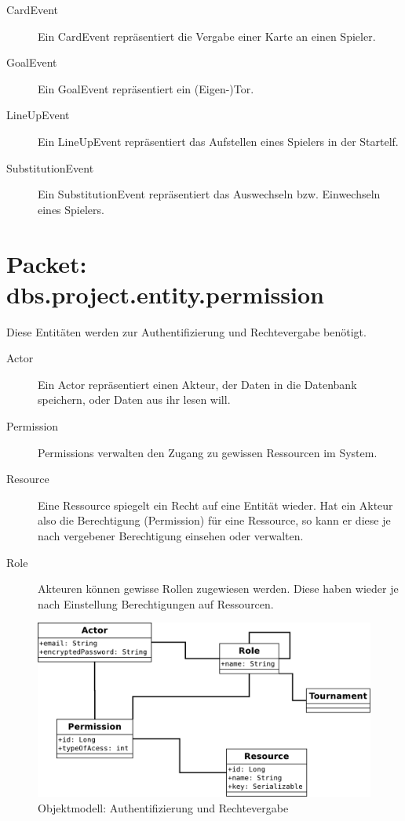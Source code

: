 \documentclass[11pt,german]{scrartcl}
\begin{document}
\begin{description}
\item [CardEvent]
Ein CardEvent repräsentiert die Vergabe einer Karte an einen Spieler.

\item [GoalEvent]
Ein GoalEvent repräsentiert ein (Eigen-)Tor.

\item [LineUpEvent]
Ein LineUpEvent repräsentiert das Aufstellen eines Spielers in der Startelf.

\item [SubstitutionEvent]
Ein SubstitutionEvent repräsentiert das Auswechseln bzw. Einwechseln eines Spielers.
\end{description}

\section{Packet: dbs.project.entity.permission}
Diese Entitäten werden zur Authentifizierung und Rechtevergabe benötigt.

\begin{description}
\item [Actor]
Ein Actor repräsentiert einen Akteur, der Daten in die Datenbank speichern, oder Daten aus ihr lesen will.

\item [Permission]
Permissions verwalten den Zugang zu gewissen Ressourcen im System.

\item [Resource]
Eine Ressource spiegelt ein Recht auf eine Entität wieder. Hat ein Akteur also die Berechtigung (Permission) für eine Ressource, so kann er diese je nach vergebener Berechtigung einsehen oder verwalten.

\item [Role]
Akteuren können gewisse Rollen zugewiesen werden. Diese haben wieder je nach Einstellung Berechtigungen auf Ressourcen.
\end{description}

\begin{figure}[htb]
\begin{center}
\leavevmode
\includegraphics[width=\textwidth]{../diagrams/objektdiagramm_permission.pdf}
\end{center}
\caption{Objektmodell: Authentifizierung und Rechtevergabe}
\label{fig:permission}
\end{figure}
\end{document}
